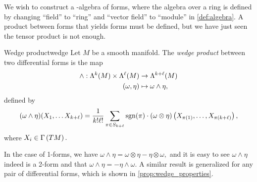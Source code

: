We wish to construct a -algebra of forms, where the algebra over a ring is defined by changing \enquote{field} to \enquote{ring} and \enquote{vector field} to \enquote{module} in \cref{def:algebra}. A product between forms that yields forms must be defined, but we have just seen the tensor product is not enough.

\begin{definition}{Wedge product}{wedge}
    Let \(M\) be a smooth manifold. The \emph{wedge product} between two differential forms is the map
    \begin{align*}
        \wedge : \forms[k]{M}\times \forms[\ell]{M} &\to \forms[k+\ell]{M}\\
                                (\omega, \eta) &\mapsto \omega \wedge \eta,
    \end{align*}
    defined by
    \begin{equation*}
        (\omega \wedge \eta)(X_1, \dots X_{k+\ell}) = \frac{1}{k! \ell!} \sum_{\pi \in S_{k+\ell}} \sgn(\pi)\cdot(\omega \otimes \eta)\left(X_{\pi(1)}, \dots, X_{\pi(k+\ell)}\right),
    \end{equation*}
    where \(X_i \in \sections{TM}.\)
\end{definition}
\begin{example}
    In the case of 1-forms, we have \(\omega \wedge \eta = \omega \otimes \eta - \eta \otimes \omega,\) and it is easy to see \(\omega \wedge \eta\) indeed is a 2-form and that \(\omega \wedge \eta = - \eta \wedge \omega\). A similar result is generalized for any pair of differential forms, which is shown in \cref{prop:wedge_properties}.
\end{example}

